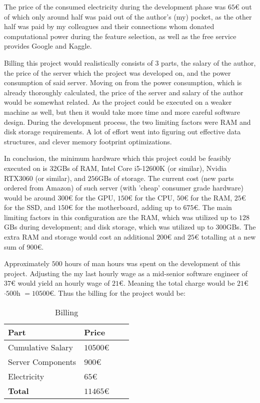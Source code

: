 The price of the consumed electricity during the development phase was $65$€ out of which only around half was paid out of the author's (my) pocket, as the other half was paid by my colleagues and their connections whom donated computational power during the feature selection, as well as the free service provides Google and Kaggle.\par
Billing this project would realistically consists of 3 parts, the salary of the author, the price of the server which the project was developed on, and the power consumption of said server. Moving on from the power consumption, which is already thoroughly calculated, the price of the server and salary of the author would be somewhat related. As the project could be executed on a weaker machine as well, but then it would take more time and more careful software design. During the development process, the two limiting factors were RAM and disk storage requirements. A lot of effort went into figuring out effective data structures, and clever memory footprint optimizations.\par
In conclusion, the minimum hardware which this project could be feasibly executed on is 32GBs of RAM, Intel Core i5-12600K (or similar), Nvidia RTX3060 (or similar), and $256$GBs of storage. The current cost (new parts ordered from Amazon) of such server (with 'cheap' consumer grade hardware) would be around $300$€ for the GPU, $150$€ for the CPU, $50$€ for the RAM, $25$€ for the SSD, and $150$€ for the motherboard, adding up to $675$€. The main limiting factors in this configuration are the RAM, which was utilized up to $128$GBs during development; and disk storage, which was utilized up to $300$GBs. The extra RAM and storage would cost an additional $200$€ and $25$€ totalling at a new sum of $900$€.\par
Approximately $500$ hours of man hours was spent on the development of this project. Adjusting the my last hourly wage as a mid-senior software engineer of $37$€  would yield an hourly wage of $21$€. Meaning the total charge would be $21$€ $ \cdot 500$h $ = 10500$€. Thus the billing for the project would be:
\begin{table}[H]
\centering
\begin{tabular}{|l|l|l|l|}
\hline
\textbf{Part} & \textbf{Price} \\ \hline
Cumulative Salary & $10500$€ \\ \hline
Server Components & $900$€ \\ \hline
Electricity & $65$€ \\ \hline
\textbf{Total} & $11465$€ \\ \hline
\end{tabular}
\caption{Billing}
\label{tab:sus2}
\end{table}

